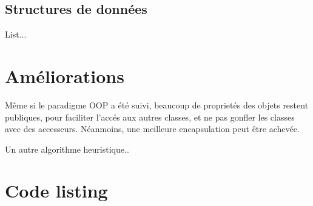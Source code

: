 \documentclass[11pt,a4paper]{article}
\begin{document}
\subsection{Structures de données}

List...

\section{Améliorations}

Même si le paradigme OOP a été suivi, beaucoup de proprietés des
objets restent publiques, pour faciliter l'accés aux autres classes,
et ne pas gonfler les classes avec des accesseurs. Néanmoins, une
meilleure encapsulation peut être achevée.

Un autre algorithme heuristique..


\newpage

\section{Code listing}


\newpage

\newpage

\newpage

\newpage

\newpage

\end{document}
